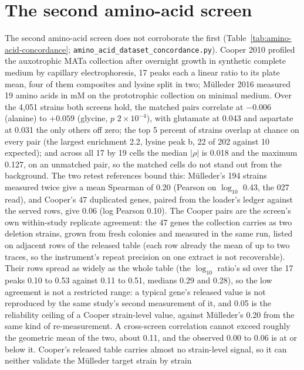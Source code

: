 \section{The second amino-acid screen}
\label{sec:concordance}

The second amino-acid screen does not corroborate the first
(Table~\ref{tab:amino-acid-concordance}; \texttt{amino\_acid\_dataset\_concordance.py}).
Cooper 2010 profiled the auxotrophic MATa collection after overnight growth in synthetic
complete medium by capillary electrophoresis, 17 peaks each a linear ratio to its plate
mean, four of them composites and lysine split in two; M\"ulleder 2016 measured 19 amino
acids in mM on the prototrophic collection on minimal medium. Over the 4,051 strains both
screens hold, the matched pairs correlate at $-0.006$ (alanine) to $+0.059$ (glycine,
$p$ $2\times10^{-4}$), with glutamate at 0.043 and aspartate at 0.031 the only others
off zero; the top 5 percent of strains overlap at chance on every pair (the largest
enrichment 2.2, lysine peak b, 22 of 202 against 10 expected); and across all 17 by 19
cells the median $|\rho|$ is 0.018 and the maximum 0.127, on an unmatched pair, so the
matched cells do not stand out from the background. The two retest references bound
this: M\"ulleder's 194 strains measured twice give a mean Spearman of 0.20 (Pearson on
$\log_{10}$ 0.43, the 027 read), and Cooper's 47 duplicated genes, paired from the
loader's ledger against the served rows, give 0.06 (log Pearson 0.10). The Cooper pairs
are the screen's own within-study replicate agreement: the 47 genes the collection
carries as two deletion strains, grown from fresh colonies and measured in the same
run, listed on adjacent rows of the released table (each row already the mean of up to
two traces, so the instrument's repeat precision on one extract is not recoverable).
Their rows spread as widely as the whole table (the $\log_{10}$ ratio's sd over the 17
peaks 0.10 to 0.53 against 0.11 to 0.51, medians 0.29 and 0.28), so the low agreement
is not a restricted range: a typical gene's released value is not reproduced by the
same study's second measurement of it, and 0.05 is the reliability ceiling of a Cooper
strain-level value, against M\"ulleder's 0.20 from the same kind of re-measurement.
A cross-screen
correlation cannot exceed roughly the geometric mean of the two, about 0.11, and the
observed 0.00 to 0.06 is at or below it. Cooper's released table carries almost no
strain-level signal, so it can neither validate the M\"ulleder target strain by strain
